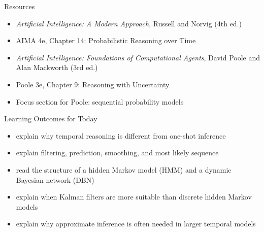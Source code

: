 \documentclass[aspectratio=169]{beamer}
\begin{document}
\begin{frame}{Resources}
\small
\begin{itemize}
  \item \textit{Artificial Intelligence: A Modern Approach}, Russell and Norvig (4th ed.)
  \item AIMA 4e, Chapter 14: Probabilistic Reasoning over Time
  \item \textit{Artificial Intelligence: Foundations of Computational Agents}, David Poole and Alan Mackworth (3rd ed.)
  \item Poole 3e, Chapter 9: Reasoning with Uncertainty
  \item Focus section for Poole: sequential probability models
\end{itemize}
\end{frame}

\begin{frame}{Learning Outcomes for Today}
\begin{itemize}
  \item explain why temporal reasoning is different from one-shot inference
  \item explain filtering, prediction, smoothing, and most likely sequence
  \item read the structure of a hidden Markov model (HMM) and a dynamic Bayesian network (DBN)
  \item explain when Kalman filters are more suitable than discrete hidden Markov models
  \item explain why approximate inference is often needed in larger temporal models
\end{itemize}
\end{frame}
\end{document}
